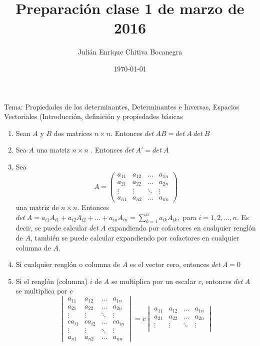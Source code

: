 \documentclass[12pt]{article}
\title{Preparación clase 1 de marzo de 2016}
\author{Julián Enrique Chitiva Bocanegra}
\date{\today}
\theoremstyle{plain}
\theoremstyle{definition}
\begin{document}
\maketitle

\begin{Large}
Tema: Propiedades de los determinantes, Determinantes e Inversas, Espacios Vectoriales (Introducción, definición y propiedades básicas
\end{Large}
        \begin{enumerate}
            \item Sean $A$ y $B$ dos matrices $n\times n$. Entonces $det\ AB=det\ A \ det \ B$
            \item Sea $A$ una matriz $n\times n$ . Entonces $det\ A\prime=det \ A$
            \item Sea \[A=\begin{pmatrix}a_{11}&a_{12}&\dots& a_{1n}\\ a_{21}& a_{22}& \dots &a_{2n}\\
            \vdots & \vdots & \ddots & \vdots\\ a_{n1}& a_{n2}& \dots & a_{nn}\end{pmatrix}\]
            una matriz de $n\times n$. Entonces $ det \ A=a_{i1}A_{i1}+a_{i2}A_{i2}+\dots+a_{in}A_{in}=\sum\limits_{k=1}^{n}a_{ik}A_{ik},$ para $i=1,2,\dots,n$. Es decir, se puede calcular $det \ A$ expandiendo por cofactores en cualquier renglón de $A$, también se puede calcular expandiendo por cofactores en cualquier columna de $A$.
            \item Si cualquier renglón o columna de $A$ es el vector cero, entonces $det\ A=0$
            \item Si el renglón (columna) $i$ de $A$ se multiplica por un escalar $c$, entonces $det\ A$ se multiplica por $c$ \[\begin{vmatrix}a_{11}&a_{12}&\dots & a_{1n}\\ a_{21}& a_{22}& \dots &a_{2n}\\
            \vdots & \vdots & \ddots & \vdots\\ca_{i1}&ca_{i2}&\dots &ca_{in}\\\vdots & \vdots & \ddots & \vdots\\ a_{n1}& a_{n2}& \dots & a_{nn}\end{vmatrix}=c\begin{vmatrix}a_{11}&a_{12}&\dots & a_{1n}\\ a_{21}& a_{22}& \dots &a_{2n}\\ \vdots & \vdots & \ddots & \vdots\\

\end{vmatrix}\]
\end{enumerate}
\end{document}
